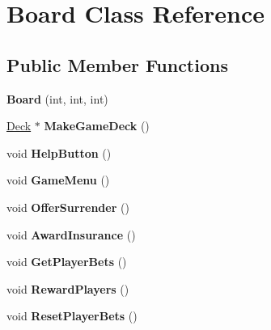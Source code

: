 \hypertarget{class_board}{}\section{Board Class Reference}
\label{class_board}
\subsection*{Public Member Functions}
\begin{DoxyCompactItemize}
\item 
{\bfseries Board} (int, int, int)\hypertarget{class_board_a299f62d90ba5fbdc8440bfe308b8a8aa}{}\label{class_board_a299f62d90ba5fbdc8440bfe308b8a8aa}

\item 
\hyperlink{class_deck}{Deck} $\ast$ {\bfseries Make\+Game\+Deck} ()\hypertarget{class_board_a0716f4188a7a6d3d4cbeecbf19c2e1b8}{}\label{class_board_a0716f4188a7a6d3d4cbeecbf19c2e1b8}

\item 
void {\bfseries Help\+Button} ()\hypertarget{class_board_adb208938666727f93d8f16673c7d6baa}{}\label{class_board_adb208938666727f93d8f16673c7d6baa}

\item 
void {\bfseries Game\+Menu} ()\hypertarget{class_board_a17cbef8bdb3bfedffd137834b53e1a83}{}\label{class_board_a17cbef8bdb3bfedffd137834b53e1a83}

\item 
void {\bfseries Offer\+Surrender} ()\hypertarget{class_board_ab6f39b1cec34664fe6d97697d31a898a}{}\label{class_board_ab6f39b1cec34664fe6d97697d31a898a}

\item 
void {\bfseries Award\+Insurance} ()\hypertarget{class_board_ad13e0d28f17bbd00bac5449a88ed7f2e}{}\label{class_board_ad13e0d28f17bbd00bac5449a88ed7f2e}

\item 
void {\bfseries Get\+Player\+Bets} ()\hypertarget{class_board_a375b51bf1380bdd7b204d8229f16e331}{}\label{class_board_a375b51bf1380bdd7b204d8229f16e331}

\item 
void {\bfseries Reward\+Players} ()\hypertarget{class_board_a4a512138d509b89f282f6eb17e02f24c}{}\label{class_board_a4a512138d509b89f282f6eb17e02f24c}

\item 
void {\bfseries Reset\+Player\+Bets} ()\hypertarget{class_board_a8ad211cf1d6e8bb62ae4488a6c6f50f3}{}\label{class_board_a8ad211cf1d6e8bb62ae4488a6c6f50f3}


\end{DoxyCompactItemize}
